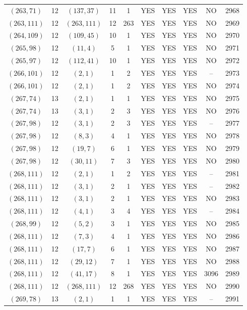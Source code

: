 \begin{longtable}{|c|c|c|c|c|c|c|c|c|c|}
$(263, 71)$ & 12 & $(137, 37)$ & 11 & 1 & YES & YES & YES & NO & 2968\\
$(263, 111)$ & 12 & $(263, 111)$ & 12 & 263 & YES & YES & YES & NO & 2969\\
$(264, 109)$ & 12 & $(109, 45)$ & 10 & 1 & YES & YES & YES & NO & 2970\\
$(265, 98)$ & 12 & $(11, 4)$ & 5 & 1 & YES & YES & YES & NO & 2971\\
$(265, 97)$ & 12 & $(112, 41)$ & 10 & 1 & YES & YES & YES & NO & 2972\\
$(266, 101)$ & 12 & $(2, 1)$ & 1 & 2 & YES & YES & YES & -- & 2973\\
$(266, 101)$ & 12 & $(2, 1)$ & 1 & 2 & YES & YES & YES & NO & 2974\\
$(267, 74)$ & 13 & $(2, 1)$ & 1 & 1 & YES & YES & YES & NO & 2975\\
$(267, 74)$ & 13 & $(3, 1)$ & 2 & 3 & YES & YES & YES & NO & 2976\\
$(267, 98)$ & 12 & $(3, 1)$ & 2 & 3 & YES & YES & YES & -- & 2977\\
$(267, 98)$ & 12 & $(8, 3)$ & 4 & 1 & YES & YES & YES & NO & 2978\\
$(267, 98)$ & 12 & $(19, 7)$ & 6 & 1 & YES & YES & YES & NO & 2979\\
$(267, 98)$ & 12 & $(30, 11)$ & 7 & 3 & YES & YES & YES & NO & 2980\\
$(268, 111)$ & 12 & $(2, 1)$ & 1 & 2 & YES & YES & YES & -- & 2981\\
$(268, 111)$ & 12 & $(3, 1)$ & 2 & 1 & YES & YES & YES & -- & 2982\\
$(268, 111)$ & 12 & $(3, 1)$ & 2 & 1 & YES & YES & YES & NO & 2983\\
$(268, 111)$ & 12 & $(4, 1)$ & 3 & 4 & YES & YES & YES & -- & 2984\\
$(268, 99)$ & 12 & $(5, 2)$ & 3 & 1 & YES & YES & YES & NO & 2985\\
$(268, 111)$ & 12 & $(7, 3)$ & 4 & 1 & YES & YES & YES & NO & 2986\\
$(268, 111)$ & 12 & $(17, 7)$ & 6 & 1 & YES & YES & YES & NO & 2987\\
$(268, 111)$ & 12 & $(29, 12)$ & 7 & 1 & YES & YES & YES & NO & 2988\\
$(268, 111)$ & 12 & $(41, 17)$ & 8 & 1 & YES & YES & YES & 3096 & 2989\\
$(268, 111)$ & 12 & $(268, 111)$ & 12 & 268 & YES & YES & YES & NO & 2990\\
$(269, 78)$ & 13 & $(2, 1)$ & 1 & 1 & YES & YES & YES & -- & 2991\\

\end{longtable}

